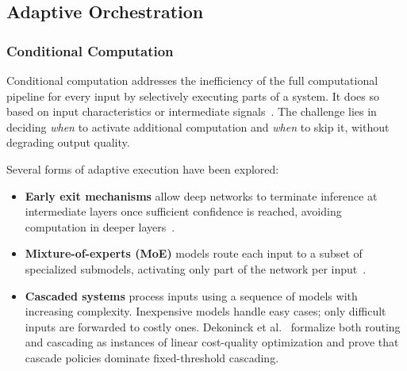 \subsection{Adaptive Orchestration}
\label{subsec:adaptive}




\subsubsection{Conditional Computation}
\label{subsec:conditional}

Conditional computation addresses the inefficiency of the full computational pipeline for 
every input by selectively executing 
parts of a system. It does so based on input characteristics or intermediate signals~\cite{moe2022}. 
The challenge lies in deciding \emph{when} to activate additional computation and 
\emph{when} to skip it, without degrading output quality.

Several forms of adaptive execution have been explored:
\begin{itemize}
    \item \textbf{Early exit mechanisms} allow deep networks to terminate inference at intermediate layers once sufficient confidence is reached, avoiding computation in deeper layers~\cite{branchynet2016, deebert2020}.
    \item \textbf{Mixture-of-experts (MoE)} models route each input to a subset of specialized submodels, activating only part of the network per input~\cite{moe2022}.
    \item \textbf{Cascaded systems} process inputs using a sequence of models with increasing complexity. Inexpensive models handle easy cases; only difficult inputs are forwarded to costly ones. Dekoninck et al.~\cite{unifiedrouting2025} formalize both routing and cascading as instances of linear cost-quality optimization and prove that cascade policies dominate fixed-threshold cascading.
\end{itemize}

